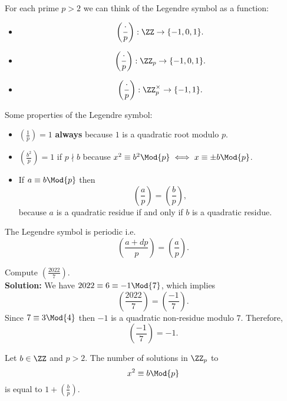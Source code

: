\documentclass[12pt, a4paper]{article}
\begin{document}
\begin{mdremark}
    For each prime \(p>2\) we can think of the Legendre symbol as a function:
    \begin{itemize}
        \item \[\left( \frac{\cdot}{p} \right): \ZZ \to \{-1,0,1\} .\]
        \item \[\left( \frac{\cdot}{p} \right): \ZZ_p \to \{-1,0,1\} .\]
        \item \[\left( \frac{\cdot}{p} \right): \ZZ_p^{\times} \to \{-1,1\} .\]
    \end{itemize}
\end{mdremark}

\begin{proposition}
    Some properties of the Legendre symbol:
    \begin{itemize}
        \item \(\left( \frac{1}{p} \right) = 1\) \textbf{always} because \(1\) is a quadratic root modulo \(p\).
        \item \(\left( \frac{b^2}{p} \right) =1\) if \(p\nmid b\) because \(x^2 \equiv b^2 \Mod{p} \iff x \equiv \pm b \Mod{p}\).
        \item If \(a \equiv b \Mod{p}\) then
        \[\left( \frac{a}{p} \right) = \left( \frac{b}{p} \right),\]
        because \(a\) is a quadratic residue if and only if \(b\) is a quadratic residue.
    \end{itemize}
\end{proposition}

\begin{mdlemma}[Periodicity]
    The Legendre symbol is periodic i.e. 
    \[\left( \frac{a+dp}{p} \right) =\left( \frac{a}{p} \right).\]
\end{mdlemma}

\begin{mdexample}
    Compute \(\left( \frac{2022}{7} \right)\). \\
    \textbf{Solution:} We have \(2022 \equiv 6 \equiv -1 \Mod{7}\), which implies
    \[\left( \frac{2022}{7} \right) = \left( \frac{-1}{7} \right).\]
    Since \(7 \equiv 3 \Mod{4}\) then \(-1\) is a quadratic non-residue modulo \(7\). Therefore,
    \[\left( \frac{-1}{7} \right) =-1.\]
\end{mdexample}

\begin{mdlemma}
    Let \(b\in \ZZ\) and \(p>2\). The number of solutions in \(\ZZ_p\) to
    \[x^2 \equiv b \Mod{p}\]
    is equal to \(1+\left( \frac{b}{p} \right)\).
\end{mdlemma}
\end{document}
